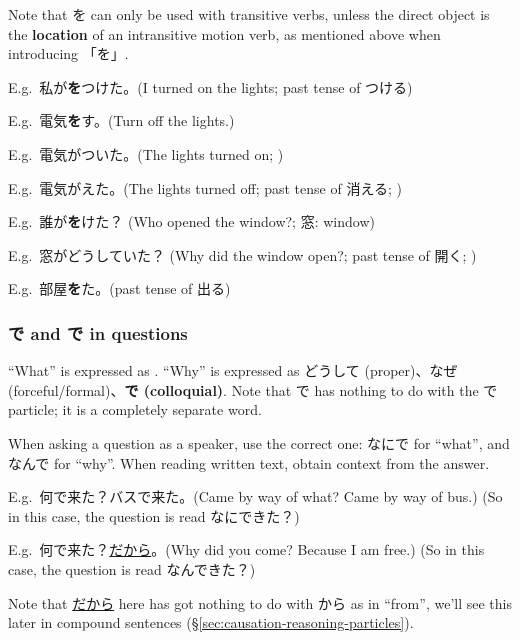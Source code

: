 \documentclass[../nihongo-gakushuu-kyouzai.tex]{subfiles}
\begin{document}
Note that を can only be used with transitive verbs, unless the direct object is the \textbf{location} of an intransitive motion verb, as mentioned above when introducing 「を」.

E.g.\ 私が\textbf{を}つけた。(I turned on the lights; past tense of つける)

E.g.\ 電気\textbf{を}す。(Turn off the lights.)

E.g.\ 電気がついた。(The lights turned on; )

E.g.\ 電気がえた。(The lights turned off; past tense of 消える; )

E.g.\ 誰が\textbf{を}けた？ (Who opened the window?; 窓: window)

E.g.\ 窓がどうしていた？ (Why did the window open?; past tense of 開く; )

E.g.\ 部屋\textbf{を}た。(past tense of 出る)


\subsubsection{で and で in questions}
``What'' is expressed as \textbf{}. ``Why'' is expressed as どうして (proper)、なぜ (forceful/formal)、\textbf{で (colloquial)}. Note that で has nothing to do with the で particle; it is a completely separate word.

When asking a question as a speaker, use the correct one: なにで for ``what'', and なんで for ``why''. When reading written text, obtain context from the answer. 

E.g.\ 何で来た？バスで来た。(Came by way of what? Came by  way of bus.) (So in this case, the question is read なにできた？)

E.g.\ 何で来た？\underline{だから}。(Why did you come? Because I am free.) (So in this case, the question is read なんできた？)

Note that \underline{だから} here has got nothing to do with から as in ``from'', we'll see this later in compound sentences (\S\ref{sec:causation-reasoning-particles}).
\end{document}
